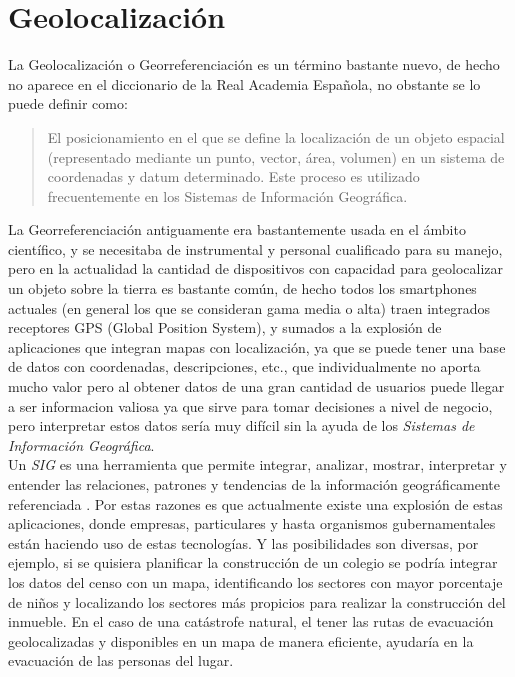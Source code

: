 \section{Geolocalización} %
\label{sec:geolocalizacion}
  La Geolocalización o Georreferenciación es un término bastante nuevo, de hecho no aparece en el diccionario de la Real Academia Española, no obstante se lo puede definir como:

  \begin{quote}
    El posicionamiento en el que se define la localización de un objeto espacial (representado mediante un punto, vector, área, volumen) en un sistema de coordenadas y datum determinado. Este proceso es utilizado frecuentemente en los Sistemas de Información Geográfica.\cite{Georreferenciacion}
  \end{quote}


  La Georreferenciación antiguamente era bastantemente usada en el ámbito científico, y se necesitaba de instrumental y personal cualificado para su manejo, pero en la actualidad la cantidad de dispositivos con capacidad para geolocalizar un objeto sobre la tierra es bastante común, de hecho todos los smartphones actuales (en general los que se consideran gama media o alta) traen integrados receptores GPS (Global Position System), y sumados a la explosión de aplicaciones  que integran mapas con localización, ya que se puede tener una base de datos con coordenadas, descripciones, etc., que individualmente no aporta mucho valor pero al obtener datos de una gran cantidad de usuarios puede llegar a ser informacion valiosa ya que sirve para tomar decisiones a nivel de negocio, pero interpretar estos datos sería muy difícil sin la ayuda de los \emph{Sistemas de Información Geográfica}.\\

  Un \emph{SIG} es una herramienta que permite integrar, analizar, mostrar, interpretar y  entender las relaciones, patrones y tendencias de la información geográficamente referenciada \cite{what_is_gis}.
  Por estas razones es que actualmente existe una explosión de estas aplicaciones, donde empresas, particulares y hasta organismos gubernamentales están haciendo uso de estas tecnologías.
  Y las posibilidades son diversas, por ejemplo, si se quisiera planificar la construcción de un colegio se podría integrar los datos del censo con un mapa, identificando los sectores con mayor porcentaje de niños y localizando los sectores más propicios para realizar la construcción del inmueble. En el caso de una catástrofe natural, el tener las rutas de evacuación geolocalizadas y disponibles en un mapa de manera eficiente,  ayudaría en la evacuación de las personas del lugar.\\


